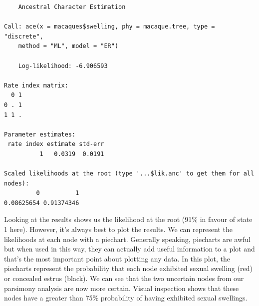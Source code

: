 \documentclass[
]{book}
\newenvironment{Shaded}{\begin{snugshade}}{\end{snugshade}}
\newcommand{\CommentTok}[1]{\textcolor[rgb]{0.56,0.35,0.01}{\textit{#1}}}
\newcommand{\DataTypeTok}[1]{\textcolor[rgb]{0.13,0.29,0.53}{#1}}
\newcommand{\KeywordTok}[1]{\textcolor[rgb]{0.13,0.29,0.53}{\textbf{#1}}}
\newcommand{\NormalTok}[1]{#1}
\newcommand{\OperatorTok}[1]{\textcolor[rgb]{0.81,0.36,0.00}{\textbf{#1}}}
\newcommand{\StringTok}[1]{\textcolor[rgb]{0.31,0.60,0.02}{#1}}
\begin{document}
\begin{Shaded}
\end{Shaded}

\begin{verbatim}
    Ancestral Character Estimation

Call: ace(x = macaques$swelling, phy = macaque.tree, type = "discrete", 
    method = "ML", model = "ER")

    Log-likelihood: -6.906593 

Rate index matrix:
  0 1
0 . 1
1 1 .

Parameter estimates:
 rate index estimate std-err
          1   0.0319  0.0191

Scaled likelihoods at the root (type '...$lik.anc' to get them for all nodes):
         0          1 
0.08625654 0.91374346 
\end{verbatim}

Looking at the results shows us the likelihood at the root (91\% in favour of state 1 here). However, it's always best to plot the results. We can represent the likelihoods at each node with a piechart. Generally speaking, piecharts are awful but when used in this way, they can actually add useful information to a plot and that's the most important point about plotting any data. In this plot, the piecharts represent the probability that each node exhibited sexual swelling (red) or concealed estrus (black). We can see that the two uncertain nodes from our parsimony analysis are now more certain. Visual inspection shows that these nodes have a greater than 75\% probability of having exhibited sexual swellings.
\end{document}
